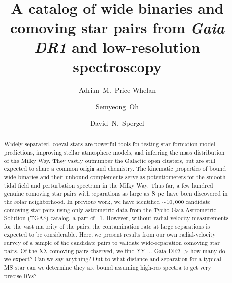 \documentclass[modern, letterpaper]{aastex61}
\newcommand{\gaia}{\project{Gaia}}
\newcommand{\DR}[1]{\acronym{DR}#1}
\begin{document}
\sloppy\sloppypar\raggedbottom\frenchspacing %

\title{A catalog of wide binaries and comoving star pairs from \textsl{Gaia DR1}
       and low-resolution spectroscopy}

\author{Adrian~M.~Price-Whelan}

\author{Semyeong~Oh}

\author{David~N.~Spergel}




\begin{abstract}
Widely-separated, coeval stars are powerful tools for testing star-formation
model predictions, improving stellar atmosphere models, and inferring the
mass distribution of the Milky Way.
They vastly outnumber the Galactic open clusters, but are still expected to
share a common origin and chemistry.
The kinematic properties of bound wide binaries and their unbound complements
serve as potentiometers for the smooth tidal field and perturbation spectrum in
the Milky Way.
Thus far, a few hundred genuine comoving star pairs with separations as large
as $8~\mathrm{pc}$ have been discovered in the solar neighborhood.
In previous work, we have identified $\sim 10,000$ candidate comoving star pairs
using only astrometric data from the Tycho-Gaia Astrometric Solution (TGAS)
catalog, a part of \gaia\ \DR{1}.
However, without radial velocity measurements for the vast majority of the
pairs, the contamination rate at large separations is expected to be
considerable.
Here, we present results from our own radial-velocity survey of a sample of the
candidate pairs to validate wide-separation comoving star pairs.
Of the XX comoving pairs observed, we find YY ...
Gaia DR2 -> how many do we expect? Can we say anything? Out to what distance and
separation for a typical MS star can we determine they are bound assuming
high-res spectra to get very precise RVs?
\end{abstract}
\end{document}
